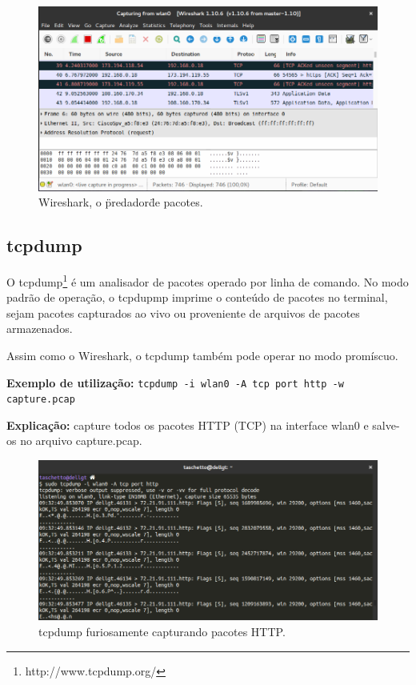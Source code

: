 \documentclass[12pt]{article}
\begin{document}
\begin{figure}[ht]
    \centering
    \includegraphics[scale=0.4]{img/wireshark.png}
    \caption{Wireshark, o \"predador\" de pacotes.}
    \label{fig:wireshark}
\end{figure}

\subsection{tcpdump}

O tcpdump\footnote{http://www.tcpdump.org/} é um analisador de pacotes operado por linha de comando. No modo padrão de operação, o tcpdupmp imprime o conteúdo de pacotes no terminal, sejam pacotes capturados ao vivo ou proveniente de arquivos de pacotes armazenados.

Assim como o Wireshark, o tcpdump também pode operar no modo promíscuo.

\textbf{Exemplo de utilização:} \texttt{tcpdump -i wlan0 -A tcp port http -w capture.pcap}

\textbf{Explicação:} capture todos os pacotes HTTP (TCP) na interface wlan0 e salve-os no arquivo capture.pcap.

\begin{figure}[ht]
    \centering
    \includegraphics[scale=0.4]{img/tcpdump.png}
    \caption{tcpdump furiosamente capturando pacotes HTTP.}
    \label{fig:tcpdump}
\end{figure}
\end{document}
